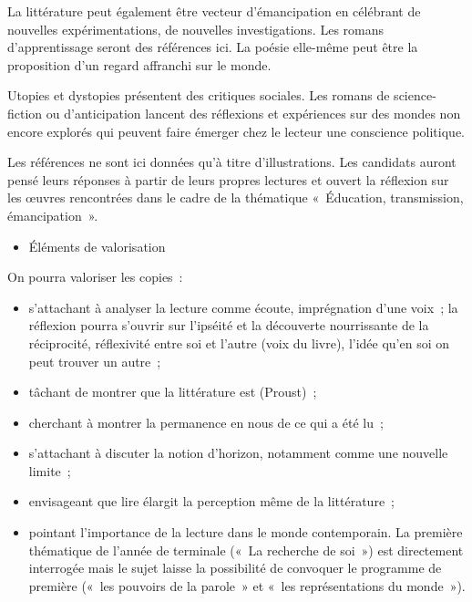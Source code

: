 {La littérature peut également être vecteur d'émancipation en célébrant de nouvelles
expérimentations, de nouvelles investigations. Les romans d'apprentissage seront des
références ici. La poésie elle-même peut être la proposition d'un regard affranchi sur
le monde.

Utopies et dystopies présentent des critiques sociales. Les romans de science-fiction
ou d'anticipation lancent des réflexions et expériences sur des mondes non encore
explorés qui peuvent faire émerger chez le lecteur une conscience politique.

Les références ne sont ici données qu'à titre d'illustrations. Les candidats auront pensé
leurs réponses à partir de leurs propres lectures et ouvert la réflexion sur les œuvres
rencontrées dans le cadre de la thématique «~Éducation, transmission,
émancipation~».

\begin{itemize}[label=\textbullet]
\item Éléments de valorisation
\end{itemize}

On pourra valoriser les copies~:
\begin{itemize}
\item s'attachant à analyser la lecture comme écoute, imprégnation d'une voix~; la réflexion
pourra s'ouvrir sur l'ipséité et la découverte nourrissante de la réciprocité, réflexivité
entre soi et l'autre (voix du livre), l'idée qu'en soi on peut trouver un autre~;
\item tâchant de montrer que la littérature est  (Proust)~;
\item cherchant à montrer la permanence en nous de ce qui a été lu~;
\item s'attachant à discuter la notion d'horizon, notamment comme une nouvelle limite~;
\item envisageant que lire élargit la perception même de la littérature~;
\item pointant l'importance de la lecture dans le monde contemporain.
La première thématique de l'année de terminale («~La recherche de soi~») est
directement interrogée mais le sujet laisse la possibilité de convoquer le programme
de première («~les pouvoirs de la parole~» et «~les représentations du monde~»).
\end{itemize}}

\vfill{~}\newpage


